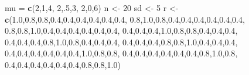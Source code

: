 \documentclass[
]{book}
\newenvironment{Shaded}{\begin{snugshade}}{\end{snugshade}}
\newcommand{\DecValTok}[1]{\textcolor[rgb]{0.00,0.00,0.81}{#1}}
\newcommand{\FloatTok}[1]{\textcolor[rgb]{0.00,0.00,0.81}{#1}}
\newcommand{\KeywordTok}[1]{\textcolor[rgb]{0.13,0.29,0.53}{\textbf{#1}}}
\newcommand{\NormalTok}[1]{#1}
\newcommand{\StringTok}[1]{\textcolor[rgb]{0.31,0.60,0.02}{#1}}
\begin{document}
\begin{Shaded}
\begin{Highlighting}[]
\NormalTok{mu =}\StringTok{ }\KeywordTok{c}\NormalTok{(}\DecValTok{2}\NormalTok{,}\DecValTok{1}\NormalTok{,}\DecValTok{4}\NormalTok{,}
       \DecValTok{2}\NormalTok{,.}\DecValTok{5}\NormalTok{,}\DecValTok{3}\NormalTok{,}
       \DecValTok{2}\NormalTok{,}\DecValTok{0}\NormalTok{,}\DecValTok{6}\NormalTok{) }
\NormalTok{n <-}\StringTok{ }\DecValTok{20}
\NormalTok{sd <-}\StringTok{ }\DecValTok{5}
\NormalTok{r <-}\StringTok{ }\KeywordTok{c}\NormalTok{(}\FloatTok{1.0}\NormalTok{,}\FloatTok{0.8}\NormalTok{,}\FloatTok{0.8}\NormalTok{,}\FloatTok{0.4}\NormalTok{,}\FloatTok{0.4}\NormalTok{,}\FloatTok{0.4}\NormalTok{,}\FloatTok{0.4}\NormalTok{,}\FloatTok{0.4}\NormalTok{,}\FloatTok{0.4}\NormalTok{,}
       \FloatTok{0.8}\NormalTok{,}\FloatTok{1.0}\NormalTok{,}\FloatTok{0.8}\NormalTok{,}\FloatTok{0.4}\NormalTok{,}\FloatTok{0.4}\NormalTok{,}\FloatTok{0.4}\NormalTok{,}\FloatTok{0.4}\NormalTok{,}\FloatTok{0.4}\NormalTok{,}\FloatTok{0.4}\NormalTok{,}
       \FloatTok{0.8}\NormalTok{,}\FloatTok{0.8}\NormalTok{,}\FloatTok{1.0}\NormalTok{,}\FloatTok{0.4}\NormalTok{,}\FloatTok{0.4}\NormalTok{,}\FloatTok{0.4}\NormalTok{,}\FloatTok{0.4}\NormalTok{,}\FloatTok{0.4}\NormalTok{,}\FloatTok{0.4}\NormalTok{,}
       \FloatTok{0.4}\NormalTok{,}\FloatTok{0.4}\NormalTok{,}\FloatTok{0.4}\NormalTok{,}\FloatTok{1.0}\NormalTok{,}\FloatTok{0.8}\NormalTok{,}\FloatTok{0.8}\NormalTok{,}\FloatTok{0.4}\NormalTok{,}\FloatTok{0.4}\NormalTok{,}\FloatTok{0.4}\NormalTok{,}
       \FloatTok{0.4}\NormalTok{,}\FloatTok{0.4}\NormalTok{,}\FloatTok{0.4}\NormalTok{,}\FloatTok{0.8}\NormalTok{,}\FloatTok{1.0}\NormalTok{,}\FloatTok{0.8}\NormalTok{,}\FloatTok{0.4}\NormalTok{,}\FloatTok{0.4}\NormalTok{,}\FloatTok{0.4}\NormalTok{,}
       \FloatTok{0.4}\NormalTok{,}\FloatTok{0.4}\NormalTok{,}\FloatTok{0.4}\NormalTok{,}\FloatTok{0.8}\NormalTok{,}\FloatTok{0.8}\NormalTok{,}\FloatTok{1.0}\NormalTok{,}\FloatTok{0.4}\NormalTok{,}\FloatTok{0.4}\NormalTok{,}\FloatTok{0.4}\NormalTok{,}
       \FloatTok{0.4}\NormalTok{,}\FloatTok{0.4}\NormalTok{,}\FloatTok{0.4}\NormalTok{,}\FloatTok{0.4}\NormalTok{,}\FloatTok{0.4}\NormalTok{,}\FloatTok{0.4}\NormalTok{,}\FloatTok{1.0}\NormalTok{,}\FloatTok{0.8}\NormalTok{,}\FloatTok{0.8}\NormalTok{,}
       \FloatTok{0.4}\NormalTok{,}\FloatTok{0.4}\NormalTok{,}\FloatTok{0.4}\NormalTok{,}\FloatTok{0.4}\NormalTok{,}\FloatTok{0.4}\NormalTok{,}\FloatTok{0.4}\NormalTok{,}\FloatTok{0.8}\NormalTok{,}\FloatTok{1.0}\NormalTok{,}\FloatTok{0.8}\NormalTok{,}
       \FloatTok{0.4}\NormalTok{,}\FloatTok{0.4}\NormalTok{,}\FloatTok{0.4}\NormalTok{,}\FloatTok{0.4}\NormalTok{,}\FloatTok{0.4}\NormalTok{,}\FloatTok{0.4}\NormalTok{,}\FloatTok{0.8}\NormalTok{,}\FloatTok{0.8}\NormalTok{,}\FloatTok{1.0}\NormalTok{)}



\end{Highlighting}
\end{Shaded}
\end{document}
